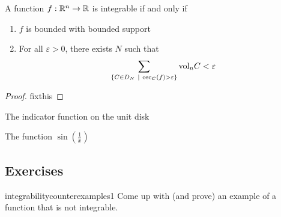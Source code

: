     \begin{theorem}
    A function $f: \mathbb{R}^n \to \mathbb{R}$ is integrable if and only if
    \begin{enumerate}
        \item $f$ is bounded with bounded support
        \item For all $\varepsilon > 0$, there exists $N$ such that $$\sum_{\{C \in D_N \ | \ \text{osc}_C(f) > \varepsilon \}} \textnormal{vol}_n C < \varepsilon$$
    \end{enumerate}
    \end{theorem}

\begin{proof}
    fixthis
\end{proof}

\begin{example}
    The indicator function on the unit disk
\end{example}

\begin{example}

The function $\sin(\frac{1}{x})$
    
    
    
\end{example}

















\subsection{Exercises}

\begin{problem}{integrabilitycounterexamples1}
Come up with (and prove) an example of a function that is not integrable.
\end{problem}

